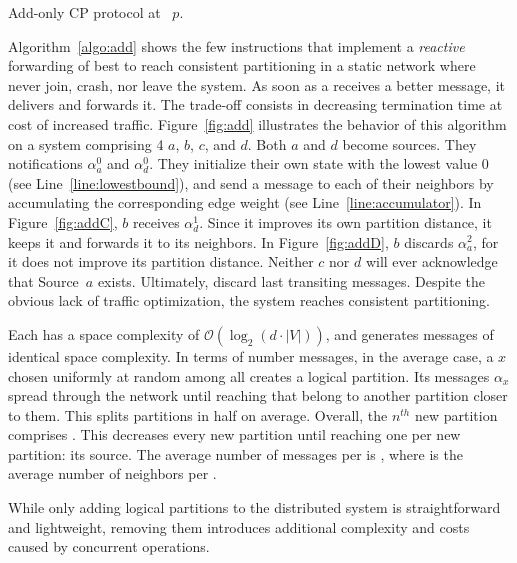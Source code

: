 \begin{algorithm}
  
  \caption{\label{algo:add}Add-only CP protocol at \Process~$p$.}
\end{algorithm}

Algorithm~\ref{algo:add} shows the few instructions that implement a
\emph{reactive} forwarding of best to reach consistent partitioning in
a static network where \processes never join, crash, nor leave the
system. As soon as a \process receives a better message, it delivers
and forwards it. The trade-off consists in decreasing termination time
at cost of increased traffic.  Figure~\ref{fig:add} illustrates the
behavior of this algorithm on a system comprising 4 \processes $a$,
$b$, $c$, and $d$. Both $a$ and $d$ become sources.  They \NAMEB
notifications $\alpha_a^0$ and $\alpha_d^0$. They initialize their own
state with the lowest value $0$ (see Line~\ref{line:lowestbound}), and
send a message to each of their neighbors by accumulating the
corresponding edge weight (see Line~\ref{line:accumulator}). In
Figure~\ref{fig:addC}, $b$ receives $\alpha_{d}^{1}$. Since it
improves its own partition distance, it keeps it and forwards it to
its neighbors. In Figure~\ref{fig:addD}, $b$ discards
$\alpha_{a}^{2}$, for it does not improve its partition
distance. Neither $c$ nor $d$ will ever acknowledge that Source~$a$
exists. Ultimately, \processes discard last transiting messages.
Despite the obvious lack of traffic optimization, the system reaches
consistent partitioning.

Each \process has a space complexity of $\mathcal{O}(\log_2(d \cdot
|V|))$, and generates messages of identical space complexity. In terms
of number messages, in the average case, a \process $x$ chosen
uniformly at random among all \processes creates a logical
partition. Its messages $\alpha_x$ spread through the network until
reaching \processes that belong to another partition closer to
them. This splits partitions in half on average. Overall, the $n^{th}$
new partition comprises  \processes. This decreases every new
partition until reaching one \process per new partition: its
source. The average number of messages per \process is
, where  is the average
number of neighbors per \process.

While only adding logical partitions to the distributed system is
straightforward and lightweight, removing them introduces additional
complexity and costs caused by concurrent operations.


